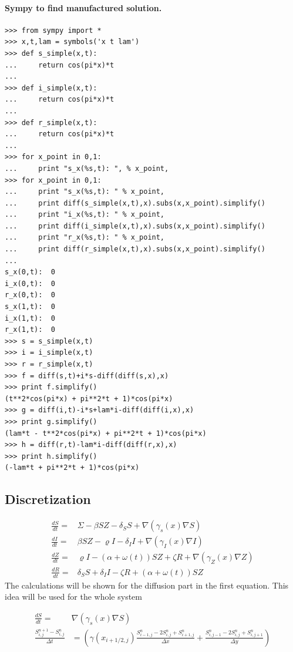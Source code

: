 \documentclass[%
twoside,                 %
final,                   %
10pt]{article}
\begin{document}
\paragraph{Sympy to find manufactured solution.}
\begin{Verbatim}[numbers=none,fontsize=\fontsize{9pt}{9pt},baselinestretch=0.95]
>>> from sympy import *
>>> x,t,lam = symbols('x t lam')
>>> def s_simple(x,t):
...     return cos(pi*x)*t
... 
>>> def i_simple(x,t):
...     return cos(pi*x)*t
... 
>>> def r_simple(x,t):
...     return cos(pi*x)*t
... 
>>> for x_point in 0,1:
...     print "s_x(%s,t): ", % x_point,
>>> for x_point in 0,1:
...     print "s_x(%s,t): " % x_point,
...     print diff(s_simple(x,t),x).subs(x,x_point).simplify()
...     print "i_x(%s,t): " % x_point,
...     print diff(i_simple(x,t),x).subs(x,x_point).simplify()
...     print "r_x(%s,t): " % x_point,
...     print diff(r_simple(x,t),x).subs(x,x_point).simplify()
... 
s_x(0,t):  0
i_x(0,t):  0
r_x(0,t):  0
s_x(1,t):  0
i_x(1,t):  0
r_x(1,t):  0
>>> s = s_simple(x,t)
>>> i = i_simple(x,t)
>>> r = r_simple(x,t)
>>> f = diff(s,t)+i*s-diff(diff(s,x),x)
>>> print f.simplify()
(t**2*cos(pi*x) + pi**2*t + 1)*cos(pi*x)
>>> g = diff(i,t)-i*s+lam*i-diff(diff(i,x),x)
>>> print g.simplify()
(lam*t - t**2*cos(pi*x) + pi**2*t + 1)*cos(pi*x)
>>> h = diff(r,t)-lam*i-diff(diff(r,x),x)
>>> print h.simplify()
(-lam*t + pi**2*t + 1)*cos(pi*x)
\end{Verbatim}
\subsection{Discretization}
\begin{equation} \label{eq:LMR_model}
	\begin{aligned} 
	\frac{dS}{dt} =& \Sigma -\beta SZ - \delta_SS + \nabla(\gamma_s(x)\nabla S) \\
	\frac{dI}{dt} =& \beta SZ - \varrho I - \delta_II+\nabla(\gamma_I(x)\nabla I)\\
	\frac{dZ}{dt} =& \varrho I- (\alpha+\omega(t))SZ + \zeta R+ \nabla(\gamma_Z(x)\nabla Z)\\
	\frac{dR}{dt} =& \delta_SS +\delta_II -\zeta R + (\alpha+\omega(t))SZ 
	\end{aligned}
\end{equation}
The calculations will be shown for the diffusion part in the first equation. This idea will be used for the whole system

\begin{equation}
	\begin{aligned}
	\frac{dS}{dt} =& \nabla(\gamma_s(x)\nabla S) \\
    \frac{S^{n+1}_{i,j}-S^n_{i,j}}{\Delta t} &= \left(\gamma(x_{i+1/2,j})\frac{S^{n}_{i-1,j}-2S^{n}_{i,j}+S^{n}_{i+1,j}}{\Delta x}+\frac{S^{n}_{i,j-1}-2S^{n}_{i,j}+S^{n}_{i,j+1}}{\Delta y}\right) 
	\end{aligned}
\end{equation}
\end{document}
